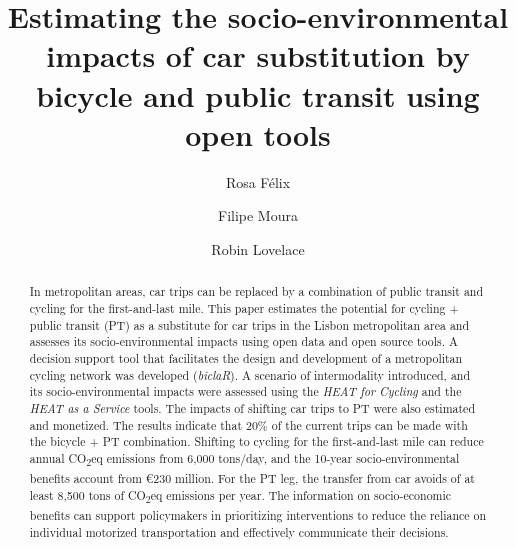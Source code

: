 \documentclass[runningheads]{llncs}
\begin{document}
\title{Estimating the socio-environmental impacts of car substitution by
bicycle and public transit using open tools}
%
%
\author{Rosa Félix \and Filipe
Moura \and Robin
Lovelace}


%


\maketitle              %
%
\begin{abstract}
In metropolitan areas, car trips can be replaced by a combination of
public transit and cycling for the first-and-last mile. This paper
estimates the potential for cycling + public transit (PT) as a
substitute for car trips in the Lisbon metropolitan area and assesses
its socio-environmental impacts using open data and open source tools. A
decision support tool that facilitates the design and development of a
metropolitan cycling network was developed (\emph{biclaR}). A scenario
of intermodality introduced, and its socio-environmental impacts were
assessed using the \emph{HEAT for Cycling} and the \emph{HEAT as a
Service} tools. The impacts of shifting car trips to PT were also
estimated and monetized. The results indicate that 20\% of the current
trips can be made with the bicycle + PT combination. Shifting to cycling
for the first-and-last mile can reduce annual CO\textsubscript{2}eq
emissions from 6,000 tons/day, and the 10-year socio-environmental
benefits account from €230 million. For the PT leg, the transfer from
car avoids of at least 8,500 tons of CO\textsubscript{2}eq emissions per
year. The information on socio-economic benefits can support
policymakers in prioritizing interventions to reduce the reliance on
individual motorized transportation and effectively communicate their
decisions.


\end{abstract}
\end{document}
